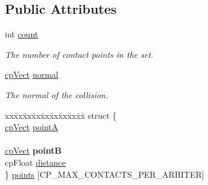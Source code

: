 \subsection*{Public Attributes}
\begin{DoxyCompactItemize}
\item 
\mbox{\label{structcpContactPointSet_a06dadd34b06a8c7f00def95ca6a1ff88}} 
int \hyperlink{structcpContactPointSet_a06dadd34b06a8c7f00def95ca6a1ff88}{count}
\begin{DoxyCompactList}\small\item\em The number of contact points in the set. \end{DoxyCompactList}\item 
\mbox{\label{structcpContactPointSet_a2fab2c7e343e14833185b2c97e9fd5b8}} 
\hyperlink{structcpVect}{cp\+Vect} \hyperlink{structcpContactPointSet_a2fab2c7e343e14833185b2c97e9fd5b8}{normal}
\begin{DoxyCompactList}\small\item\em The normal of the collision. \end{DoxyCompactList}\item 
\mbox{\label{structcpContactPointSet_a502bbcd00a97d6c92b7f00a5307498b9}} 
\begin{tabbing}
xx\=xx\=xx\=xx\=xx\=xx\=xx\=xx\=xx\=\kill
struct \{\\
\>\hyperlink{structcpVect}{cpVect} \hyperlink{structcpContactPointSet_a9d7ac05d747afa63699e89ea6dba62c2}{pointA}\\
\>\\
\>\hyperlink{structcpVect}{cpVect} {\bfseries pointB}\\
\>cpFloat \hyperlink{structcpContactPointSet_ad8581bff488e9f44ef899f75e044bc6c}{distance}\\
\} \hyperlink{structcpContactPointSet_a502bbcd00a97d6c92b7f00a5307498b9}{points} \mbox{[}CP\_MAX\_CONTACTS\_PER\_ARBITER\mbox{]}\\


\end{tabbing}
\end{DoxyCompactItemize}

